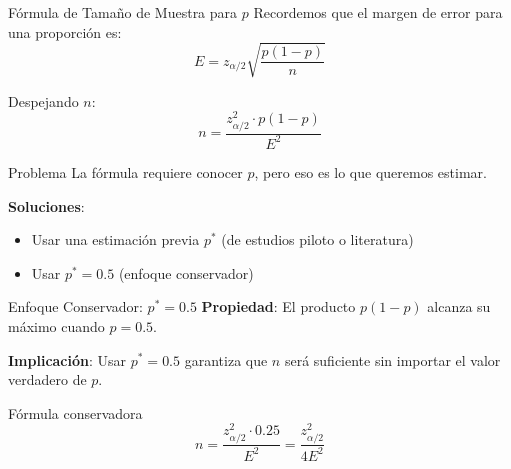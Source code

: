 \documentclass[aspectratio=169, 11pt]{beamer}
\begin{document}
\begin{frame}{Fórmula de Tamaño de Muestra para $p$}
Recordemos que el margen de error para una proporción es:
\[
E = z_{\alpha/2} \sqrt{\frac{p(1-p)}{n}}
\]

Despejando $n$:
\[
n = \frac{z_{\alpha/2}^2 \cdot p(1-p)}{E^2}
\]

\vspace{0.3cm}
\begin{alertblock}{Problema}
La fórmula requiere conocer $p$, pero eso es lo que queremos estimar.
\end{alertblock}

\vspace{0.3cm}
\textbf{Soluciones}:
\begin{itemize}
  \item Usar una estimación previa $p^*$ (de estudios piloto o literatura)
  \item Usar $p^* = 0.5$ (enfoque conservador)
\end{itemize}
\end{frame}

\begin{frame}{Enfoque Conservador: $p^* = 0.5$}
\textbf{Propiedad}: El producto $p(1-p)$ alcanza su máximo cuando $p = 0.5$.

\begin{center}
\end{center}

\small
\textbf{Implicación}: Usar $p^* = 0.5$ garantiza que $n$ será suficiente \alert{sin importar el valor verdadero de $p$}.

\begin{block}{Fórmula conservadora}
\[
n = \frac{z_{\alpha/2}^2 \cdot 0.25}{E^2} = \frac{z_{\alpha/2}^2}{4E^2}
\]
\end{block}
\end{frame}
\end{document}
